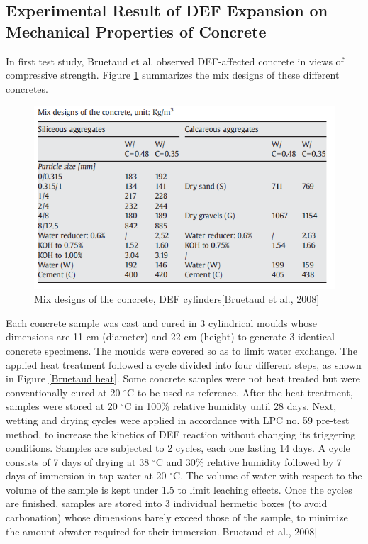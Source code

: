 \clearpage
\subsection{Experimental Result of DEF Expansion on Mechanical Properties of Concrete}

In first test study, Bruetaud et al.\cite{Bruetaud} observed DEF-affected concrete in views of compressive strength. Figure \ref{Bruetaud Mix designs} summarizes the mix designs of these different concretes.

\begin{figure}[h!]
  \centering
  \includegraphics[width=0.8\linewidth]{Reference/Bruetaud1.png}
  \caption{Mix designs of the concrete, DEF cylinders[Bruetaud et al., 2008\cite{Bruetaud}]}
  \label{Bruetaud Mix designs}
\end{figure}

Each concrete sample was cast and cured in 3 cylindrical moulds whose dimensions are 11 cm (diameter) and 22 cm (height) to generate 3 identical concrete specimens. The moulds were covered so as to limit water exchange. The applied heat treatment followed a cycle divided into four different steps, as shown in Figure \ref{Bruetaud heat}. Some concrete samples were not heat treated but were conventionally cured at 20 $^\circ$C to be used as reference. After the heat treatment, samples were stored at 20 $^\circ$C in 100\% relative humidity until 28 days. Next, wetting and drying cycles were applied in accordance with LPC no. 59 pre-test method, to increase the kinetics of DEF reaction without changing its triggering conditions. Samples are subjected to 2 cycles, each one lasting 14 days. A cycle consists of 7 days of drying at 38 $^\circ$C and 30\% relative humidity followed by 7 days of immersion in tap water at 20 $^\circ$C. The volume of water with respect to the volume of the sample is kept under 1.5 to limit leaching effects. Once the cycles are finished, samples are stored into 3 individual hermetic boxes (to avoid carbonation) whose dimensions barely exceed those of the sample, to minimize the amount ofwater required for their immersion.[Bruetaud et al., 2008\cite{Bruetaud}]


